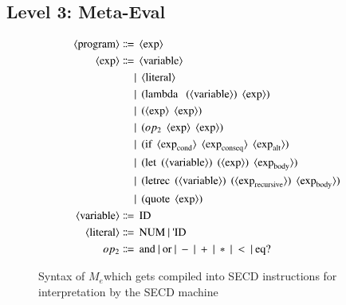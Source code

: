 \documentclass[a4paper,12pt,twoside,openright]{report}
\theoremstyle{definition}
\newcommand{\ts}{\textquotesingle}
\newcommand{\mevl}{$M_{e}$}
\begin{document}
\subsection{Level 3: Meta-Eval}
\begin{figure}[ht!]
\begin{align*}
	\langle \text{program} \rangle \Coloneqq & \:\: \langle \text{exp} \rangle \\
	\langle \text{exp} \rangle \Coloneqq & \:\: \langle \text{variable} \rangle \\
															   & | \:\: \langle \text{literal} \rangle \\
															   & | \:\: \text{(lambda \: (} \langle \text{variable} \rangle\text{)} \:\: \langle \text{exp} \rangle\text{)} \\
															   & | \:\: \text{(} \langle \text{exp} \rangle \:\: \langle \text{exp} \rangle \text{)} \\
															   & | \:\: \text{(} op_{2} \:\: \langle \text{exp} \rangle \:\: \langle \text{exp} \rangle \text{)} \\
															   & | \:\: \text{(if} \:\: \langle \text{exp}_\text{cond} \rangle \:\: \langle \text{exp}_\text{conseq} \rangle \:\: \langle \text{exp}_\text{alt} \rangle \text{)} \\
															   & | \:\: \text{(let} \:\: \text{(} \langle \text{variable} \rangle \text{)} \:\: \text{(}\langle \text{exp} \rangle \text{)} \:\: \langle \text{exp}_\text{body} \rangle \text{)} \\
															   & | \:\: \text{(letrec} \:\: \text{(} \langle \text{variable} \rangle \text{)} \:\: \text{(}\langle \text{exp}_\text{recursive} \rangle \text{)} \:\: \langle \text{exp}_\text{body} \rangle \text{)} \\
															   & | \:\: \text{(quote} \:\: \langle \text{exp} \rangle \text{)} \\
	\langle \text{variable} \rangle \Coloneqq & \:\: \text{ID} \\
	\langle \text{literal} \rangle \Coloneqq & \:\: \text{NUM} \: | \: \text{{\ts}ID} \\
	op_{2} \Coloneqq & \:\: \text{and} \: | \: \text{or} \: | \: - \: | \: + \: | \: * \: | \: < \: | \: \text{eq?}
\end{align*}
\caption{Syntax of \mevl which gets compiled into SECD instructions for interpretation by the SECD machine}
\label{fig:mevl_syntax}
\end{figure}
\end{document}
